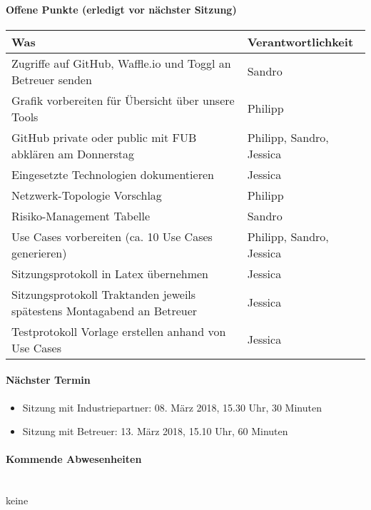 \paragraph{Offene Punkte (erledigt vor nächster Sitzung)} \mbox{}
\begin{table}[H]
	\centering
	\begin{tabularx}{\textwidth}{X | p{4.5cm}}
		\rowcolor{gray!50}
		\textbf{Was} & \textbf{Verantwortlichkeit} \\
		\hline	

		Zugriffe auf GitHub, Waffle.io und Toggl an Betreuer senden & Sandro \\
		Grafik vorbereiten für Übersicht über unsere Tools & Philipp \\
		GitHub private oder public mit FUB abklären am Donnerstag & Philipp, Sandro, Jessica \\
		Eingesetzte Technologien dokumentieren & Jessica \\
		Netzwerk-Topologie Vorschlag & Philipp \\
		Risiko-Management Tabelle & Sandro \\
		Use Cases vorbereiten (ca. 10 Use Cases generieren) & Philipp, Sandro, Jessica \\
		Sitzungsprotokoll in Latex übernehmen & Jessica \\
		Sitzungsprotokoll Traktanden jeweils spätestens Montagabend an Betreuer	& Jessica \\
		Testprotokoll Vorlage erstellen anhand von Use Cases & Jessica \\

	\end{tabularx}
	\label{tab:my-label}
\end{table}

\paragraph{Nächster Termin}
\begin{itemize}	
	\item Sitzung mit Industriepartner: 08. März 2018, 15.30 Uhr, 30 Minuten
	\item Sitzung mit Betreuer: 13. März 2018, 15.10 Uhr, 60 Minuten
\end{itemize}

\paragraph{Kommende Abwesenheiten} \mbox{}\\
keine

